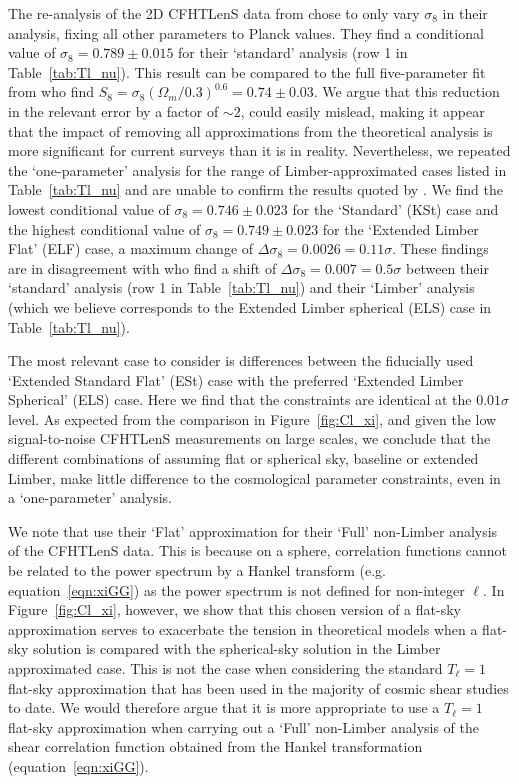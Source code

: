 The \citet{kitching/etal:2016} re-analysis of the 2D CFHTLenS data from \citet{kilbinger/etal:2013} chose to only vary $\sigma_8$ in their analysis, fixing all other parameters to Planck values. They find a conditional value of $\sigma_8 = 0.789 \pm 0.015$ for their `standard' analysis (row 1 in Table~\ref{tab:Tl_nu}). This result can be compared to the full five-parameter fit from \citet{kilbinger/etal:2013} who find $S_8=\sigma_8(\Omega_m/0.3)^{0.6} = 0.74 \pm 0.03$.   We argue that this reduction in the relevant error by a factor of $\sim 2$, could easily mislead, making it appear that the impact of removing all approximations from the theoretical analysis is more significant for current surveys than it is in reality.  Nevertheless, we repeated the `one-parameter' analysis for the range of Limber-approximated cases listed in Table~\ref{tab:Tl_nu} and are unable to confirm the results quoted by \citet{kitching/etal:2016}.   We find the lowest conditional value of $\sigma_8 = 0.746 \pm 0.023$ for the `Standard' (KSt) case and the highest conditional value of $\sigma_8 = 0.749 \pm 0.023$ for the `Extended Limber Flat' (ELF) case, a maximum change of $\Delta \sigma_8 = 0.0026 = 0.11 \sigma$.  These findings are in disagreement with \citet{kitching/etal:2016} who find a shift of $\Delta \sigma_8 = 0.007 = 0.5\sigma$ between their `standard' analysis (row 1 in Table~\ref{tab:Tl_nu}) and their `Limber' analysis (which we believe corresponds to the Extended Limber spherical (ELS) case in Table~\ref{tab:Tl_nu}).  

The most relevant case to consider is differences between the fiducially used `Extended Standard Flat' (ESt) case with the preferred `Extended Limber Spherical' (ELS) case.  Here we find that the constraints are identical at the $0.01\sigma$ level.  As expected from the comparison in Figure~\ref{fig:Cl_xi}, and given the low signal-to-noise CFHTLenS measurements on large scales, we conclude that the different combinations of assuming flat or spherical sky, baseline or extended Limber, make little difference to the cosmological parameter constraints, even in a `one-parameter' analysis.    

We note that \citet{kitching/etal:2016} use their `Flat' approximation for their `Full' non-Limber analysis of the CFHTLenS data.   This is because on a sphere, correlation functions cannot be related to the power spectrum by a Hankel transform (e.g. equation~\ref{eqn:xiGG}) as the power spectrum is not defined for non-integer $\ell$.   In Figure~\ref{fig:Cl_xi}, however, we show that this chosen version of a flat-sky approximation serves to exacerbate the tension in theoretical models when a flat-sky solution is compared with the spherical-sky solution in the Limber approximated case.  This is not the case when considering the standard $T_\ell = 1$ flat-sky approximation that has been used in the majority of cosmic shear studies to date.  We would therefore argue that it is more appropriate to use a $T_\ell = 1$ flat-sky approximation when carrying out a `Full' non-Limber analysis of the shear correlation function obtained from the Hankel transformation (equation~\ref{eqn:xiGG}).

